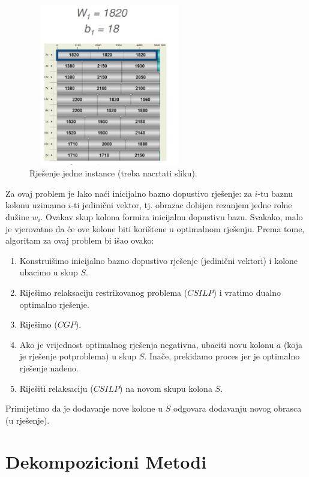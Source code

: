 \documentclass[a4paper, utf8, 11pt, colorlinks]{article}
\begin{document}
 \begin{figure}[!ht]
     \centering
     \includegraphics[width=200pt, height=200pt]{cutting_stock.jpg}
     \caption{Rješenje jedne instance (treba nacrtati sliku).}
     \label{fig:cuting_stock_solutions}
 \end{figure}
 Za ovaj problem je lako naći inicijalno bazno dopustivo rješenje:
 za $i$-tu baznu kolonu uzimamo $i$-ti jedinični vektor, tj. obrazac dobijen rezanjem jedne rolne dužine $w_i$. Ovakav skup kolona formira inicijalnu dopustivu bazu. Svakako, malo je vjerovatno da će ove kolone biti korištene u optimalnom rješenju. 
 Prema tome, algoritam za ovaj problem bi išao ovako:
 \begin{enumerate}
     \item Konstruišimo inicijalno bazno dopustivo rješenje (jedinični vektori) i kolone ubacimo u skup $S$.
     \item Riješimo relaksaciju restrikovanog problema ($CSILP$) i vratimo dualno optimalno rješenje. 
     \item Riješimo ($CGP$).
     \item Ako je vrijednost optimalnog rješenja negativna, ubaciti novu kolonu $a$ (koja je rješenje potproblema) u skup $S$. Inače, prekidamo proces jer je optimalno rješenje nađeno. 
     \item Riješiti relaksaciju ($CSILP$) na novom skupu kolona $S$.
 \end{enumerate}
 Primijetimo da je dodavanje nove kolone u $S$ odgovara dodavanju novog obrasca (u rješenje). 
 
 
 \newpage
 
 \section{Dekompozicioni Metodi}
 
\end{document}
